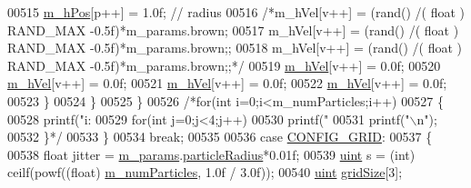 \begin{DoxyCode}
{00515                         \hyperlink{class_particle_system_ab9d75471d2eaaeb8fa98d2f3f47d9c25}{m\_hPos}[p++] = 1.0f; \textcolor{comment}{// radius}
00516                         \textcolor{comment}{/*m\_hVel[v++] = (rand() /( float ) RAND\_MAX -0.5f)*m\_params.brown;}
00517 \textcolor{comment}{                        m\_hVel[v++] = (rand() /( float ) RAND\_MAX -0.5f)*m\_params.brown;;}
00518 \textcolor{comment}{                        m\_hVel[v++] = (rand() /( float ) RAND\_MAX -0.5f)*m\_params.brown;;*/}
00519                                                 \hyperlink{class_particle_system_a20560c896ee8a8bbc827a8e5902da7e2}{m\_hVel}[v++] = 0.0f;
00520                                                 \hyperlink{class_particle_system_a20560c896ee8a8bbc827a8e5902da7e2}{m\_hVel}[v++] = 0.0f;
00521                                                 \hyperlink{class_particle_system_a20560c896ee8a8bbc827a8e5902da7e2}{m\_hVel}[v++] = 0.0f;
00522                         \hyperlink{class_particle_system_a20560c896ee8a8bbc827a8e5902da7e2}{m\_hVel}[v++] = 0.0f;
00523                                                 \}
00524                     \}
00525                 \}
00526                                 \textcolor{comment}{/*for(int i=0;i<m\_numParticles;i++)}
00527 \textcolor{comment}{                                \{}
00528 \textcolor{comment}{                                        printf("i: %
00529 \textcolor{comment}{                                        for(int j=0;j<4;j++)}
00530 \textcolor{comment}{                                                printf("%
00531 \textcolor{comment}{                                        printf("\(\backslash\)n");}
00532 \textcolor{comment}{                                \}*/}
00533             \}
00534             \textcolor{keywordflow}{break};
00535 
00536         \textcolor{keywordflow}{case} \hyperlink{class_particle_system_a1dca3996c8068602412ef9f7826605d1aa6bd9e92edfc102877bf103547397b47}{CONFIG\_GRID}:
00537             \{
00538                 \textcolor{keywordtype}{float} jitter = \hyperlink{class_particle_system_ab765472aed6a1b5f0d2f98a3a906c417}{m\_params}.\hyperlink{struct_sim_params_a7e131c24e1020c44173deb0f57a8c4af}{particleRadius}*0.01f;
00539                 \hyperlink{particles__kernel_8cuh_a91ad9478d81a7aaf2593e8d9c3d06a14}{uint} s = (int) ceilf(powf((\textcolor{keywordtype}{float}) \hyperlink{class_particle_system_a23d238efa80a647d4b6cde034f486a91}{m\_numParticles}, 1.0f / 3.0f));
00540                 \hyperlink{particles__kernel_8cuh_a91ad9478d81a7aaf2593e8d9c3d06a14}{uint} \hyperlink{particles_8cpp_aefe301f4cc6d6838e3627b5970e855a9}{gridSize}[3];
}}}
\end{DoxyCode}
